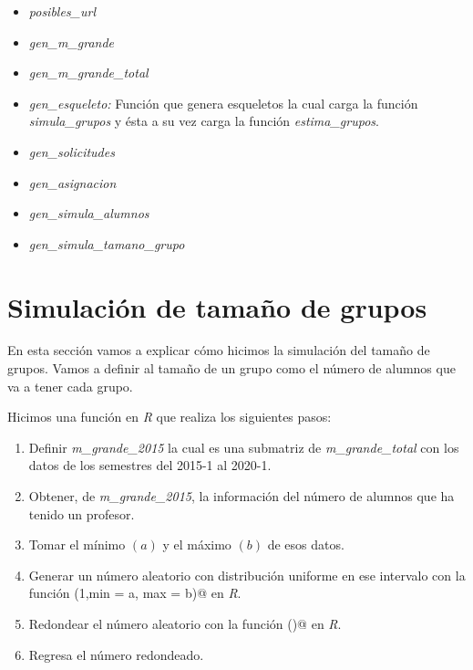 \begin{itemize}
\item \textit{posibles\_url}

\item \textit{gen\_m\_grande}

\item \textit{gen\_m\_grande\_total}

\item \textit{gen\_esqueleto: } Función que genera esqueletos la cual carga la función \textit{simula\_grupos} y ésta a su vez carga la función \textit{estima\_grupos}.

\item \textit{gen\_solicitudes}

\item \textit{gen\_asignacion}

\item \textit{gen\_simula\_alumnos}

\item \textit{gen\_simula\_tamano\_grupo}
\end{itemize}



\section{Simulación de tamaño de grupos} \label{SimTamGpos}

En esta sección vamos a explicar cómo hicimos la simulación del tamaño de grupos. Vamos a definir al tamaño de un grupo como el número de alumnos que va a tener cada grupo.

Hicimos una función en \textit{R} que realiza los siguientes pasos:

\begin{enumerate}
\item Definir \textit{m\_grande\_2015} la cual es una submatriz de \textit{m\_grande\_total} con los datos de los semestres del 2015-1 al 2020-1.

\item Obtener, de \textit{m\_grande\_2015}, la información del número de alumnos que ha tenido un profesor.

\item Tomar el mínimo $(a)$ y el máximo $(b)$ de esos datos.

\item Generar un número aleatorio con distribución uniforme en ese intervalo con la función \verb@runif(1,min = a, max = b)@ en \textit{R}.

\item Redondear el número aleatorio con la función \verb@ceiling()@ en \textit{R}.

\item Regresa el número redondeado.
\end{enumerate}

